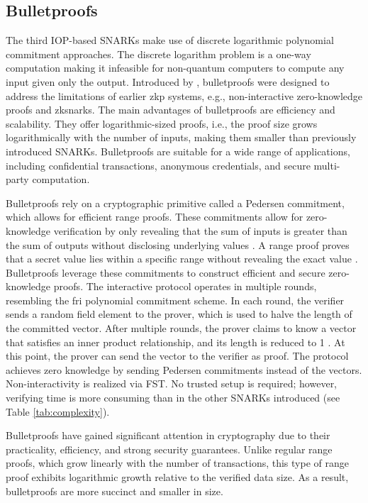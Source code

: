 \subsection{Bulletproofs}
The third IOP-based SNARKs make use of discrete logarithmic polynomial commitment approaches. The discrete logarithm problem is a one-way computation making it infeasible for non-quantum computers to compute any input given only the output. Introduced by \citet{bulletproofs}, bulletproofs were designed to address the limitations of earlier \acrshort{zkp} systems, e.g., non-interactive zero-knowledge proofs and \acrshort{zksnark}s. The main advantages of bulletproofs are efficiency and scalability. They offer logarithmic-sized proofs, i.e., the proof size grows logarithmically with the number of inputs, making them smaller than previously introduced SNARKs. Bulletproofs are suitable for a wide range of applications, including confidential transactions, anonymous credentials, and secure multi-party computation.

Bulletproofs rely on a cryptographic primitive called a Pedersen commitment, which allows for efficient range proofs. These commitments allow for zero-knowledge verification by only revealing that the sum of inputs is greater than the sum of outputs without disclosing underlying values \citep{rangepedersen}. A range proof proves that a secret value lies within a specific range without revealing the exact value \citep{Chung2022BulletproofsSP}. Bulletproofs leverage these commitments to construct efficient and secure zero-knowledge proofs. The interactive protocol operates in multiple rounds, resembling the \acrshort{fri} polynomial commitment scheme. In each round, the verifier sends a random field element to the prover, which is used to halve the length of the committed vector. After multiple rounds, the prover claims to know a vector that satisfies an inner product relationship, and its length is reduced to 1 \citep{Thaler, Godden}. At this point, the prover can send the vector to the verifier as proof. The protocol achieves zero knowledge by sending Pedersen commitments instead of the vectors. Non-interactivity is realized via FST. No trusted setup is required; however, verifying time is more consuming than in the other SNARKs introduced (see Table \ref{tab:complexity}). 

Bulletproofs have gained significant attention in cryptography due to their practicality, efficiency, and strong security guarantees. Unlike regular range proofs, which grow linearly with the number of transactions, this type of range proof exhibits logarithmic growth relative to the verified data size. As a result, bulletproofs are more succinct and smaller in size.


